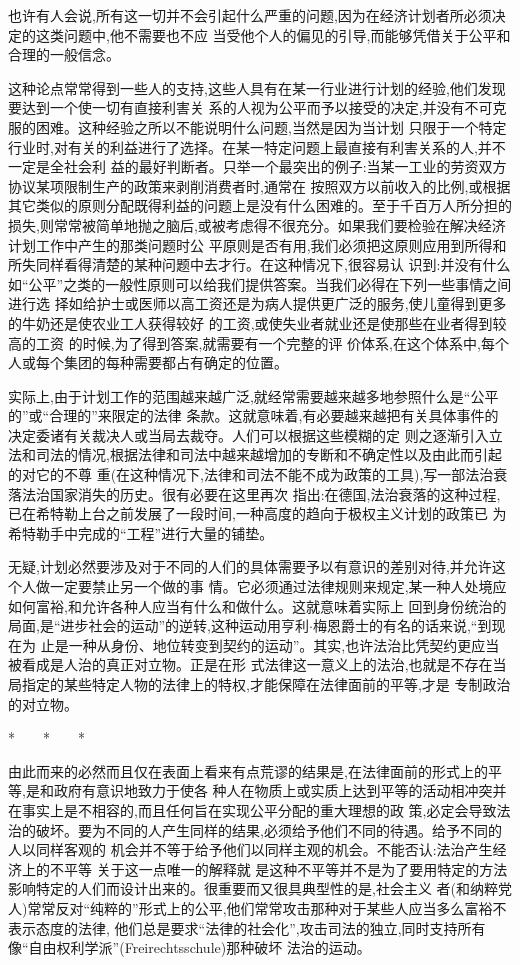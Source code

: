 ﻿\documentclass[12pt]{article}
\begin{document}
也许有人会说,所有这一切并不会引起什么严重的问题,因为在经济计划者所必须决定的这类问题中,他不需要也不应
当受他个人的偏见的引导,而能够凭借关于公平和合理的一般信念。

这种论点常常得到一些人的支持,这些人具有在某一行业进行计划的经验,他们发现要达到一个使一切有直接利害关
系的人视为公平而予以接受的决定,并没有不可克服的困难。这种经验之所以不能说明什么问题,当然是因为当计划
只限于一个特定行业时,对有关的利益进行了选择。在某一特定问题上最直接有利害关系的人,并不一定是全社会利
益的最好判断者。只举一个最突出的例子:当某一工业的劳资双方协议某项限制生产的政策来剥削消费者时,通常在
按照双方以前收入的比例,或根据其它类似的原则分配既得利益的问题上是没有什么困难的。至于千百万人所分担的
损失,则常常被简单地抛之脑后,或被考虑得不很充分。如果我们要检验在解决经济计划工作中产生的那类问题时公
平原则是否有用,我们必须把这原则应用到所得和所失同样看得清楚的某种问题中去才行。在这种情况下,很容易认
识到:并没有什么如``公平''之类的一般性原则可以给我们提供答案。当我们必得在下列一些事情之间进行选
择\myrule 如给护士或医师以高工资还是为病人提供更广泛的服务,使儿童得到更多的牛奶还是使农业工人获得较好
的工资,或使失业者就业还是使那些在业者得到较高的工资 \myrule 的时候,为了得到答案,就需要有一个完整的评
价体系,在这个体系中,每个人或每个集团的每种需要都占有确定的位置。

实际上,由于计划工作的范围越来越广泛,就经常需要越来越多地参照什么是``公平的''或``合理的''来限定的法律
条款。这就意味着,有必要越来越把有关具体事件的决定委诸有关裁决人或当局去裁夺。人们可以根据这些模糊的定
则之逐渐引入立法和司法的情况,根据法律和司法中越来越增加的专断和不确定性以及由此而引起的对它的不尊
重(在这种情况下,法律和司法不能不成为政策的工具),写一部法治衰落法治国家消失的历史。很有必要在这里再次
指出:在德国,法治衰落的这种过程,已在希特勒上台之前发展了一段时间,一种高度的趋向于极权主义计划的政策已
为希特勒手中完成的``工程''进行大量的铺垫。

无疑,计划必然要涉及对于不同的人们的具体需要予以有意识的差别对待,并允许这个人做一定要禁止另一个做的事
情。它必须通过法律规则来规定,某一种人处境应如何富裕,和允许各种人应当有什么和做什么。这就意味着实际上
回到身份统治的局面,是``进步社会的运动''的逆转,这种运动用亨利$\cdot$梅恩爵士的有名的话来说,``到现在为
止是一种从身份、地位转变到契约的运动''。其实,也许法治比凭契约更应当被看成是人治的真正对立物。正是在形
式法律这一意义上的法治,也就是不存在当局指定的某些特定人物的法律上的特权,才能保障在法律面前的平等,才是
专制政治的对立物。

*　　*　　*

由此而来的必然而且仅在表面上看来有点荒谬的结果是,在法律面前的形式上的平等,是和政府有意识地致力于使各
种人在物质上或实质上达到平等的活动相冲突并在事实上是不相容的,而且任何旨在实现公平分配的重大理想的政
策,必定会导致法治的破坏。要为不同的人产生同样的结果,必须给予他们不同的待遇。给予不同的人以同样客观的
机会并不等于给予他们以同样主观的机会。不能否认:法治产生经济上的不平等 \myrule 关于这一点唯一的解释就
是这种不平等并不是为了要用特定的方法影响特定的人们而设计出来的。很重要而又很具典型性的是,社会主义
者(和纳粹党人)常常反对``纯粹的''形式上的公平,他们常常攻击那种对于某些人应当多么富裕不表示态度的法律,
他们总是要求``法律的社会化'',攻击司法的独立,同时支持所有像``自由权利学派''(Freirechtsschule)那种破坏
法治的运动。
\end{document}
